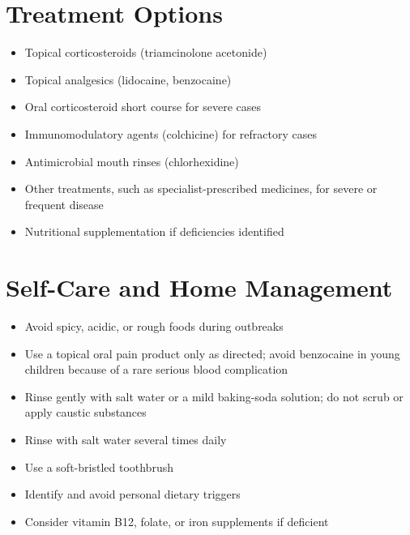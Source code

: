 \section*{Treatment Options}
\begin{itemize}
\item Topical corticosteroids (triamcinolone acetonide)
\item Topical analgesics (lidocaine, benzocaine)
\item Oral corticosteroid short course for severe cases
\item Immunomodulatory agents (colchicine) for refractory cases
\item Antimicrobial mouth rinses (chlorhexidine)
 \item Other treatments, such as specialist-prescribed medicines, for severe or frequent disease
\item Nutritional supplementation if deficiencies identified
\end{itemize}

\section*{Self-Care and Home Management}
\begin{itemize}
\item Avoid spicy, acidic, or rough foods during outbreaks
 \item Use a topical oral pain product only as directed; avoid benzocaine in young children because of a rare serious blood complication
 \item Rinse gently with salt water or a mild baking-soda solution; do not scrub or apply caustic substances
\item Rinse with salt water several times daily
\item Use a soft-bristled toothbrush
\item Identify and avoid personal dietary triggers
\item Consider vitamin B12, folate, or iron supplements if deficient
\end{itemize}

